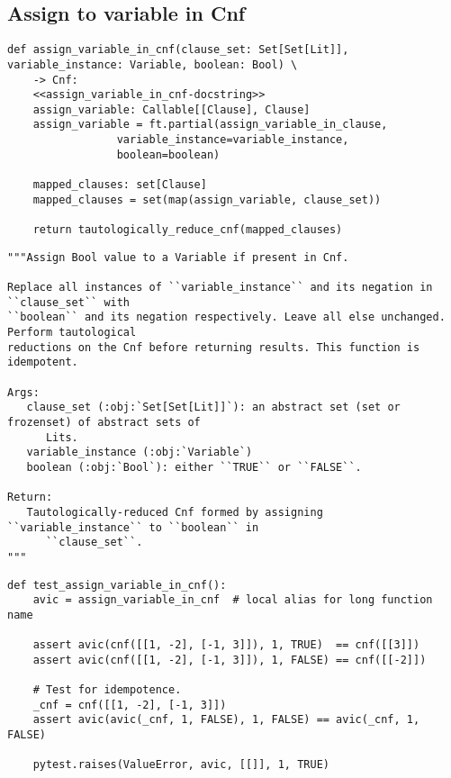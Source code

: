 \documentclass[11pt]{article}
\begin{document}
\subsection{Assign to variable in Cnf}
\label{sec:org4137674}

\begin{verbatim}
def assign_variable_in_cnf(clause_set: Set[Set[Lit]], variable_instance: Variable, boolean: Bool) \
	-> Cnf:
    <<assign_variable_in_cnf-docstring>>
    assign_variable: Callable[[Clause], Clause]
    assign_variable = ft.partial(assign_variable_in_clause,
				 variable_instance=variable_instance,
				 boolean=boolean)

    mapped_clauses: set[Clause]
    mapped_clauses = set(map(assign_variable, clause_set))

    return tautologically_reduce_cnf(mapped_clauses)
\end{verbatim}

\begin{verbatim}
"""Assign Bool value to a Variable if present in Cnf.

Replace all instances of ``variable_instance`` and its negation in ``clause_set`` with
``boolean`` and its negation respectively. Leave all else unchanged. Perform tautological
reductions on the Cnf before returning results. This function is idempotent.

Args:
   clause_set (:obj:`Set[Set[Lit]]`): an abstract set (set or frozenset) of abstract sets of
      Lits.
   variable_instance (:obj:`Variable`)
   boolean (:obj:`Bool`): either ``TRUE`` or ``FALSE``.

Return:
   Tautologically-reduced Cnf formed by assigning ``variable_instance`` to ``boolean`` in
      ``clause_set``.
"""
\end{verbatim}


\begin{verbatim}
def test_assign_variable_in_cnf():
    avic = assign_variable_in_cnf  # local alias for long function name

    assert avic(cnf([[1, -2], [-1, 3]]), 1, TRUE)  == cnf([[3]])
    assert avic(cnf([[1, -2], [-1, 3]]), 1, FALSE) == cnf([[-2]])

    # Test for idempotence.
    _cnf = cnf([[1, -2], [-1, 3]])
    assert avic(avic(_cnf, 1, FALSE), 1, FALSE) == avic(_cnf, 1, FALSE)

    pytest.raises(ValueError, avic, [[]], 1, TRUE)
\end{verbatim}
\end{document}

